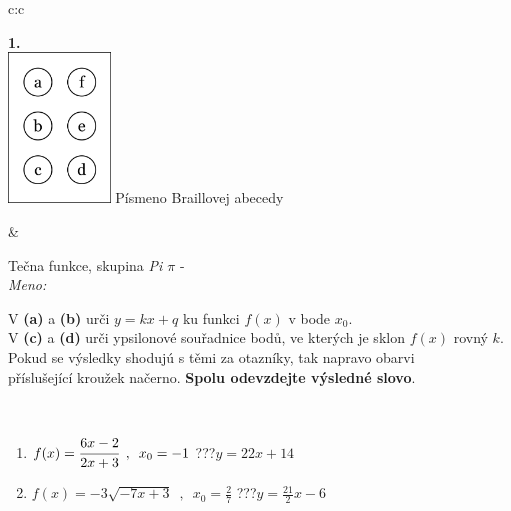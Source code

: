 \documentclass[10pt]{report}
\begin{document}
\begin{tabular}{c:c}
\begin{minipage}[c][104.5mm][t]{0.5\linewidth}
\begin{center}
\begin{minipage}{0.20\linewidth}
\begin{center}
{\Huge\bfseries 1.} \\[2mm]
\includegraphics[height=40mm]{../images/braille.png}
{\small Písmeno Braillovej abecedy}
\end{center}
\end{minipage}
\end{center}
\end{minipage}
&
\begin{minipage}[c][104.5mm][t]{0.5\linewidth}
\begin{center}
\vspace{7mm}
{\huge Tečna funkce, skupina \textit{Pi $\pi$} -}\\[5mm]
\textit{Meno:}\phantom{xxxxxxxxxxxxxxxxxxxxxxxxxxxxxxxxxxxxxxxxxxxxxxxxxxxxxxxxxxxxxxxxx}\\[5mm]
\begin{minipage}{0.95\linewidth}
\begin{center}
V \textbf{(a)} a \textbf{(b)} urči  $y = kx + q$ ku funkci $f(x)$ v bode $x_0$.\\V \textbf{(c)} a \textbf{(d)} urči ypsilonové souřadnice bodů, ve kterých je sklon $f(x)$ rovný $k$.\\Pokud se výsledky shodujú s těmi za otazníky, tak napravo obarvi\\příslušející kroužek načerno. \textbf{Spolu odevzdejte výsledné slovo}.
\end{center}
\end{minipage}
\\[1mm]
\begin{minipage}{0.79\linewidth}
\begin{center}
\begin{varwidth}{\linewidth}
\begin{enumerate}
\small
\item $f(x)=\cfrac{6x-2}{2x+3}\enspace , \enspace x_0=-1$\quad \dotfill\; ???\;\dotfill \quad $y = 22x+14$
\item $f(x)=-3\sqrt{-7x+3}\enspace , \enspace x_0=\frac{2}{7}$\quad \dotfill\; ???\;\dotfill \quad $y = \frac{21}{2}x-6$

\end{enumerate}
\end{varwidth}
\end{center}
\end{minipage}
\end{center}
\end{minipage}
\end{tabular}
\end{document}

